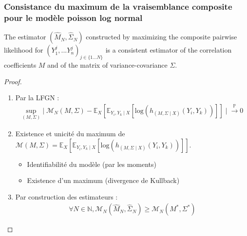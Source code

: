 \documentclass[11pt,table]{beamer}
\begin{document}
\begin{frame}
\frametitle{Consistance du maximum de la vraisemblance composite pour le modèle poisson log normal}
\begin{theorem}
The estimator $(\widehat{M}_N,\widehat{\Sigma}_N)$ constructed by maximizing the composite pairwise likelihood for $(Y^j_1,...Y^j_n)_{j \in \{1...N\}}$ is a consistent estimator of the correlation coefficients $M$ and of the matrix of variance-covariance $\Sigma$.
\end{theorem}
\end{frame}
\begin{frame}
\begin{proof}
\begin{enumerate}
\item Par la LFGN :
\begin{align*}
\underset{(M,\Sigma)}{\mathrm{sup}} \mid \mathcal{M}_N(M, \Sigma)- \mathbb{E}_X [\mathbb{E}_{Y_i,Y_k \mid X} [ \mathrm{log}(h_{(M,\Sigma \mid X)} (Y_i,Y_k))]] \mid\overset{\mathbb{P}}{\longrightarrow}  0
\end{align*} 
\item Existence et unicité du maximum de $\mathcal{M}(M,\Sigma) = \mathbb{E}_X [\mathbb{E}_{Y_i,Y_k \mid X} [ \mathrm{log}(h_{(M,\Sigma \mid X)} (Y_i,Y_k))]]$.
\begin{itemize}
\item Identifiabilité du modèle (par les moments)
\item Existence d'un maximum (divergence de Kullback)
\end{itemize}
\item Par construction des estimateurs : 
\begin{align*}
\forall N \in \mathbb{N},  \mathcal{M}_N(\widehat{M}_N, \widehat{\Sigma}_N) \geq \mathcal{M}_N(M^\ast, \Sigma^\ast) 
\end{align*}
\end{enumerate}
\end{proof}
\end{frame}
\end{document}
